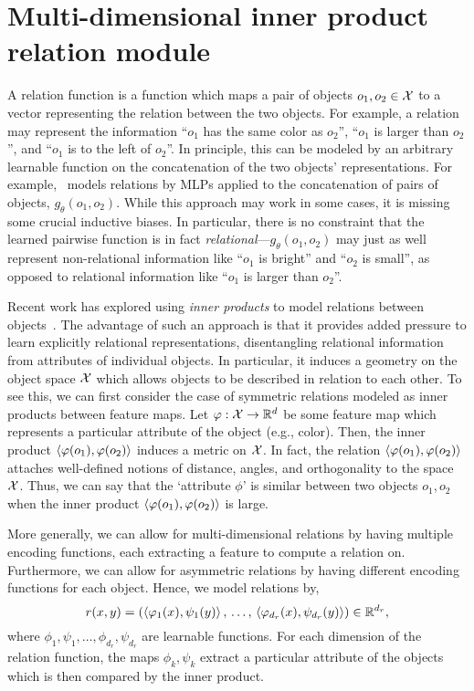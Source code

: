 \section{Multi-dimensional inner product relation module}\label{sec:mhr}

A relation function is a function which maps a pair of objects $o_1, o_2 \in {\mathcal{X}}$ to a vector representing the relation between the two objects. For example, a relation may represent the information ``$o_1$ has the same color as $o_2$'', ``$o_1$ is larger than $o_2$'', and ``$o_1$ is to the left of $o_2$''. In principle, this can be modeled by an arbitrary learnable function on the concatenation of the two objects' representations. For example,~\citep{santoroSimpleNeural2017} models relations by MLPs applied to the concatenation of pairs of objects, $g_\theta(o_1, o_2)$. While this approach may work in some cases, it is missing some crucial inductive biases. In particular, there is no constraint that the learned pairwise function is in fact \textit{relational}---$g_\theta(o_1, o_2)$ may just as well represent non-relational information like ``$o_1$ is bright'' and ``$o_2$ is small'', as opposed to relational information like ``$o_1$ is larger than $o_2$''.

Recent work has explored using \textit{inner products} to model relations between objects~\citep{webbEmergentSymbols2021, kergNeuralArchitecture2022, altabaaAbstractorsTransformer2023}. The advantage of such an approach is that it provides added pressure to learn explicitly relational representations, disentangling relational information from attributes of individual objects. In particular, it induces a geometry on the object space ${\mathcal{X}}$ which allows objects to be described in relation to each other. To see this, we can first consider the case of symmetric relations modeled as inner products between feature maps. Let $\varphi: {\mathcal{X}} \to \mathbb{R}^d$ be some feature map which represents a particular attribute of the object (e.g., color). Then, the inner product $\left \langle \varphi(o_1), \varphi(o_2) \right\rangle$ induces a metric on ${\mathcal{X}}$. In fact, the relation $\left \langle \varphi(o_1), \varphi(o_2) \right\rangle$ attaches well-defined notions of distance, angles, and orthogonality to the space ${\mathcal{X}}$. Thus, we can say that the `attribute $\phi$' is similar between two objects $o_1, o_2$ when the inner product $\left \langle \varphi(o_1), \varphi(o_2) \right\rangle$ is large.

More generally, we can allow for multi-dimensional relations by having multiple encoding functions, each extracting a feature to compute a relation on. Furthermore, we can allow for asymmetric relations by having different encoding functions for each object. Hence, we model relations by,
\begin{equation}\label{eq:relation_function}
    r(x, y) = \left(
        \left \langle \varphi_1(x), \psi_1(y) \right\rangle,\, \ldots,\, \left \langle \varphi_{d_r}(x), \psi_{d_r}(y) \right\rangle\right) \in \mathbb{R}^{d_r},
\end{equation}
where $\phi_1, \psi_1, \ldots, \phi_{d_r}, \psi_{d_r}$ are learnable functions. For each dimension of the relation function, the maps $\phi_k, \psi_k$ extract a particular attribute of the objects which is then compared by the inner product.

